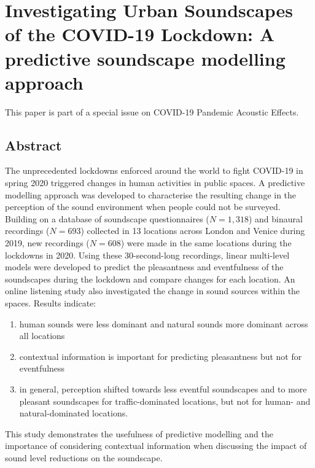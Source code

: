 \chapter[Study III: Predictive Soundscape Modelling of the Lockdowns]{Investigating Urban Soundscapes of the COVID-19 Lockdown: A predictive soundscape modelling approach}

This paper is part of a special issue on COVID-19 Pandemic Acoustic Effects.

\section*{Abstract}
 The unprecedented lockdowns enforced around the world to fight COVID-19 in spring 2020 triggered changes in human activities in public spaces. A predictive modelling approach was developed to characterise the resulting change in the perception of the sound environment when people could not be surveyed. Building on a database of soundscape questionnaires ($N = 1,318$) and binaural recordings ($N = 693$) collected in 13 locations across London and Venice during 2019, new recordings ($N = 608$) were made in the same locations during the lockdowns in 2020. Using these 30-second-long recordings, linear multi-level models were developed to predict the pleasantness and eventfulness of the soundscapes during the lockdown and compare changes for each location. An online listening study also investigated the change in sound sources within the spaces. Results indicate:

 \begin{enumerate}
   \item human sounds were less dominant and natural sounds more dominant across all locations
   \item contextual information is important for predicting pleasantness but not for eventfulness
   \item in general, perception shifted towards less eventful soundscapes and to more pleasant soundscapes for traffic-dominated locations, but not for human- and natural-dominated locations.
 \end{enumerate}

 This study demonstrates the usefulness of predictive modelling and the importance of considering contextual information when discussing the impact of sound level reductions on the soundscape.

